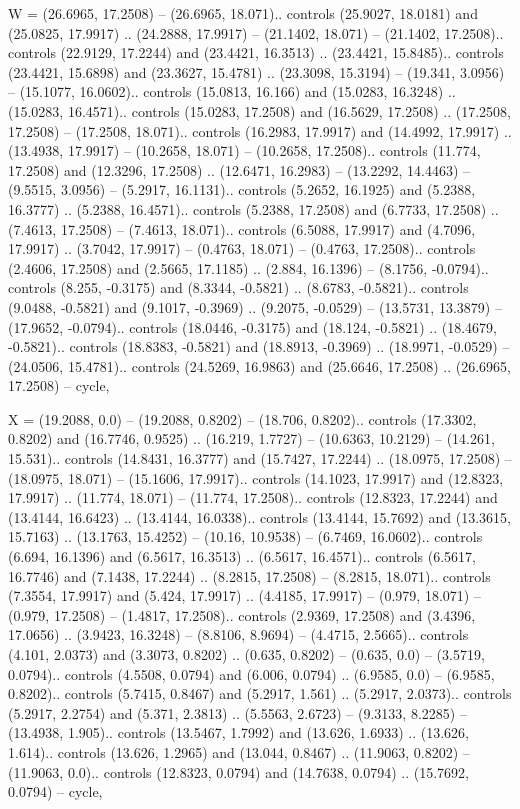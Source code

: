 W = {(26.6965, 17.2508) -- (26.6965, 18.071).. controls (25.9027, 18.0181) and (25.0825, 17.9917) .. (24.2888, 17.9917) -- (21.1402, 18.071) -- (21.1402, 17.2508).. controls (22.9129, 17.2244) and (23.4421, 16.3513) .. (23.4421, 15.8485).. controls (23.4421, 15.6898) and (23.3627, 15.4781) .. (23.3098, 15.3194) -- (19.341, 3.0956) -- (15.1077, 16.0602).. controls (15.0813, 16.166) and (15.0283, 16.3248) .. (15.0283, 16.4571).. controls (15.0283, 17.2508) and (16.5629, 17.2508) .. (17.2508, 17.2508) -- (17.2508, 18.071).. controls (16.2983, 17.9917) and (14.4992, 17.9917) .. (13.4938, 17.9917) -- (10.2658, 18.071) -- (10.2658, 17.2508).. controls (11.774, 17.2508) and (12.3296, 17.2508) .. (12.6471, 16.2983) -- (13.2292, 14.4463) -- (9.5515, 3.0956) -- (5.2917, 16.1131).. controls (5.2652, 16.1925) and (5.2388, 16.3777) .. (5.2388, 16.4571).. controls (5.2388, 17.2508) and (6.7733, 17.2508) .. (7.4613, 17.2508) -- (7.4613, 18.071).. controls (6.5088, 17.9917) and (4.7096, 17.9917) .. (3.7042, 17.9917) -- (0.4763, 18.071) -- (0.4763, 17.2508).. controls (2.4606, 17.2508) and (2.5665, 17.1185) .. (2.884, 16.1396) -- (8.1756, -0.0794).. controls (8.255, -0.3175) and (8.3344, -0.5821) .. (8.6783, -0.5821).. controls (9.0488, -0.5821) and (9.1017, -0.3969) .. (9.2075, -0.0529) -- (13.5731, 13.3879) -- (17.9652, -0.0794).. controls (18.0446, -0.3175) and (18.124, -0.5821) .. (18.4679, -0.5821).. controls (18.8383, -0.5821) and (18.8913, -0.3969) .. (18.9971, -0.0529) -- (24.0506, 15.4781).. controls (24.5269, 16.9863) and (25.6646, 17.2508) .. (26.6965, 17.2508) -- cycle},

X = {(19.2088, 0.0) -- (19.2088, 0.8202) -- (18.706, 0.8202).. controls (17.3302, 0.8202) and (16.7746, 0.9525) .. (16.219, 1.7727) -- (10.6363, 10.2129) -- (14.261, 15.531).. controls (14.8431, 16.3777) and (15.7427, 17.2244) .. (18.0975, 17.2508) -- (18.0975, 18.071) -- (15.1606, 17.9917).. controls (14.1023, 17.9917) and (12.8323, 17.9917) .. (11.774, 18.071) -- (11.774, 17.2508).. controls (12.8323, 17.2244) and (13.4144, 16.6423) .. (13.4144, 16.0338).. controls (13.4144, 15.7692) and (13.3615, 15.7163) .. (13.1763, 15.4252) -- (10.16, 10.9538) -- (6.7469, 16.0602).. controls (6.694, 16.1396) and (6.5617, 16.3513) .. (6.5617, 16.4571).. controls (6.5617, 16.7746) and (7.1438, 17.2244) .. (8.2815, 17.2508) -- (8.2815, 18.071).. controls (7.3554, 17.9917) and (5.424, 17.9917) .. (4.4185, 17.9917) -- (0.979, 18.071) -- (0.979, 17.2508) -- (1.4817, 17.2508).. controls (2.9369, 17.2508) and (3.4396, 17.0656) .. (3.9423, 16.3248) -- (8.8106, 8.9694) -- (4.4715, 2.5665).. controls (4.101, 2.0373) and (3.3073, 0.8202) .. (0.635, 0.8202) -- (0.635, 0.0) -- (3.5719, 0.0794).. controls (4.5508, 0.0794) and (6.006, 0.0794) .. (6.9585, 0.0) -- (6.9585, 0.8202).. controls (5.7415, 0.8467) and (5.2917, 1.561) .. (5.2917, 2.0373).. controls (5.2917, 2.2754) and (5.371, 2.3813) .. (5.5563, 2.6723) -- (9.3133, 8.2285) -- (13.4938, 1.905).. controls (13.5467, 1.7992) and (13.626, 1.6933) .. (13.626, 1.614).. controls (13.626, 1.2965) and (13.044, 0.8467) .. (11.9063, 0.8202) -- (11.9063, 0.0).. controls (12.8323, 0.0794) and (14.7638, 0.0794) .. (15.7692, 0.0794) -- cycle},

